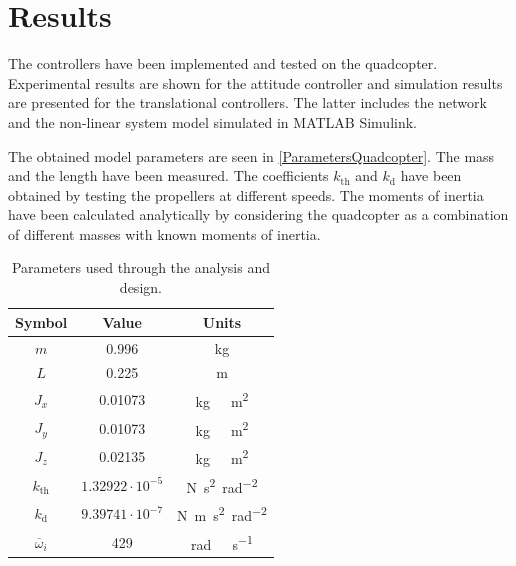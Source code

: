 \section{Results}\label{sec:results}
The controllers have been implemented and tested on the quadcopter. Experimental results are shown for the attitude controller and simulation results are presented for the translational controllers. The latter includes the network and the non-linear system model simulated in MATLAB Simulink.

The obtained model parameters are seen in \autoref{ParametersQuadcopter}. The mass and the length have been measured. The coefficients $k_{\mathrm{th}}$ and $k_{\mathrm{d}}$ have been obtained by testing the propellers at different speeds. The moments of inertia have been calculated analytically by considering the quadcopter as a combination of different masses with known moments of inertia.
\begin{table}[H]
    \centering
    \begin{tabular}{|c|c|c|}
    \hline
        \textbf{Symbol} &\textbf{Value} &\textbf{Units}\\
        \hline %
        $m$ & 0.996       &kg\\
        \hline %
        $L$  &   0.225       & m\\
        \hline %
        $J_x$  & 0.01073       & \si{kg \  m^2}\\
        \hline %
        $J_y$  & 0.01073       & \si{kg \  m^2}\\
        \hline %
        $J_z$  & 0.02135       & \si{kg \  m^2}\\
        \hline %
        $k_{\mathrm{th}}$  & $1.32922\cdot10^{-5}$       & \si{N s^2 rad^{-2}}\\
        \hline %
        $k_{\mathrm{d}}$  & $9.39741 \cdot10^{-7}$       & \si{N m s^2  rad^{-2}}\\
        \hline %
        $\overline{\omega}_i$& 429      & \si{rad \ s^{-1}}\\
        \hline
    \end{tabular}
    \caption{Parameters used through the analysis and design.}
    \label{ParametersQuadcopter}
\end{table}

